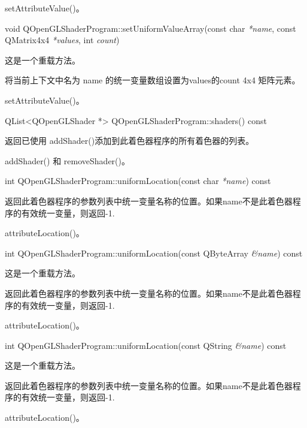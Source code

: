 \begin{seeAlso}
setAttributeValue()。
\end{seeAlso}

void QOpenGLShaderProgram::setUniformValueArray(const char \emph{*name}, const QMatrix4x4 \emph{*values}, int \emph{count})

这是一个重载方法。

将当前上下文中名为 name 的统一变量数组设置为values的count 4x4 矩阵元素。

\begin{seeAlso}
setAttributeValue()。
\end{seeAlso}

QList<QOpenGLShader *> QOpenGLShaderProgram::shaders() const

返回已使用 addShader()添加到此着色器程序的所有着色器的列表。

\begin{seeAlso}
addShader() 和 removeShader()。
\end{seeAlso}

int QOpenGLShaderProgram::uniformLocation(const char \emph{*name}) const

返回此着色器程序的参数列表中统一变量名称的位置。如果name不是此着色器程序的有效统一变量，则返回-1.

\begin{seeAlso}
attributeLocation()。
\end{seeAlso}

int QOpenGLShaderProgram::uniformLocation(const QByteArray \emph{\&name}) const

这是一个重载方法。

返回此着色器程序的参数列表中统一变量名称的位置。如果name不是此着色器程序的有效统一变量，则返回-1.

\begin{seeAlso}
attributeLocation()。
\end{seeAlso}

int QOpenGLShaderProgram::uniformLocation(const QString \emph{\&name}) const

这是一个重载方法。

返回此着色器程序的参数列表中统一变量名称的位置。如果name不是此着色器程序的有效统一变量，则返回-1.

\begin{seeAlso}
attributeLocation()。
\end{seeAlso}
